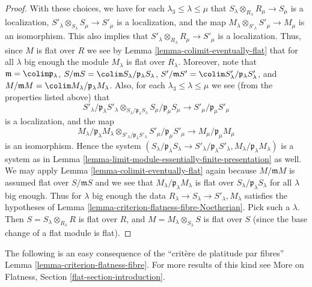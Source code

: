 \begin{proof}
\medskip\noindent
With these choices, we have for each $\lambda_3 \leq \lambda \leq \mu$
that $S_\lambda \otimes_{R_{\lambda}} R_\mu \to S_\mu$ is a localization,
$S'_\lambda \otimes_{S_{\lambda}} S_\mu \to S'_\mu$ is a localization, and
the map $M_\lambda \otimes_{S'_\lambda} S'_\mu \to M_\mu$ is an
isomorphism. This also implies that
$S'_\lambda \otimes_{R_{\lambda}} R_\mu \to S'_\mu$ is a localization.
Thus, since $M$ is flat over $R$ we see by
Lemma \ref{lemma-colimit-eventually-flat} that
for all $\lambda$ big enough the module $M_\lambda$ is
flat over $R_\lambda$.
Moreover, note that
$
\mathfrak m = \colim \mathfrak p_\lambda
$,
$
S/\mathfrak mS = \colim S_\lambda/\mathfrak p_\lambda S_\lambda
$,
$
S'/\mathfrak mS' = \colim S'_\lambda/\mathfrak p_\lambda S'_\lambda
$,
and
$
M/\mathfrak mM = \colim M_\lambda/\mathfrak p_\lambda M_\lambda
$. Also, for each $\lambda_3 \leq \lambda \leq \mu$ we see (from the
properties listed above) that
$$
S'_\lambda/\mathfrak p_\lambda S'_\lambda
\otimes_{S_{\lambda}/\mathfrak p_\lambda S_\lambda}
S_\mu/\mathfrak p_\mu S_\mu
\longrightarrow
S'_\mu/\mathfrak p_\mu S'_\mu
$$
is a localization, and the map
$$
M_\lambda / \mathfrak p_\lambda M_\lambda
\otimes_{S'_\lambda/\mathfrak p_\lambda S'_\lambda}
S'_\mu /\mathfrak p_\mu S'_\mu
\longrightarrow
M_\mu/\mathfrak p_\mu M_\mu
$$
is an isomorphism. Hence the system
$(S_\lambda/\mathfrak p_\lambda S_\lambda \to
S'_\lambda/\mathfrak p_\lambda S'_\lambda,
M_\lambda/\mathfrak p_\lambda M_\lambda)$
is a system as in
Lemma \ref{lemma-limit-module-essentially-finite-presentation} as well.
We may apply Lemma \ref{lemma-colimit-eventually-flat} again because
$M/\mathfrak m M$ is assumed flat over $S/\mathfrak mS$ and we see that
$M_\lambda/\mathfrak p_\lambda M_\lambda$ is flat over
$S_\lambda/\mathfrak p_\lambda S_\lambda$ for all $\lambda$ big enough.
Thus for $\lambda$ big enough the data
$R_\lambda \to S_\lambda \to S'_\lambda, M_\lambda$ satisfies
the hypotheses of Lemma \ref{lemma-criterion-flatness-fibre-Noetherian}.
Pick such a $\lambda$. Then $S = S_\lambda \otimes_{R_\lambda} R$
is flat over $R$, and $M = M_\lambda \otimes_{S_\lambda} S$
is flat over $S$ (since the base change of a flat module is flat).
\end{proof}

\noindent
The following is an easy consequence of the ``crit\`ere de platitude par
fibres'' Lemma \ref{lemma-criterion-flatness-fibre}. For more results of
this kind see More on Flatness, Section \ref{flat-section-introduction}.

